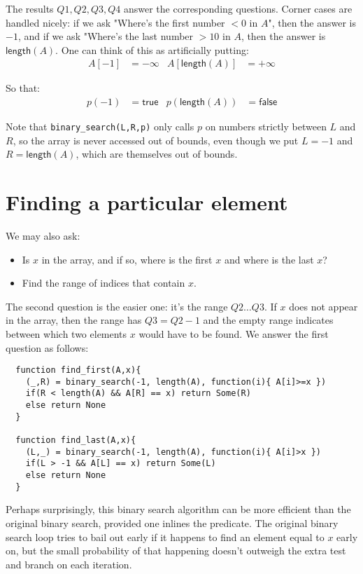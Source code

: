 \documentclass[a4paper, 11pt]{article}
\begin{document}
\noindent The results $Q1,Q2,Q3,Q4$ answer the corresponding questions. Corner cases are handled nicely: if we ask "Where's the first number $<0$ in $A$", then the answer is $-1$, and if we ask "Where's the last number $>10$ in $A$, then the answer is $\mathsf{length}(A)$. One can think of this as artificially putting:
\begin{align*}
  A[-1] &= -\infty & A[\mathsf{length}(A)] &= +\infty
\end{align*}

So that:
\begin{align*}
  p(-1) &= \mathsf{true} & p(\mathsf{length}(A)) &= \mathsf{false}
\end{align*}

Note that \lstinline|binary_search(L,R,p)| only calls $p$ on numbers strictly between $L$ and $R$, so the array is never accessed out of bounds, even though we put $L=-1$ and $R=\mathsf{length}(A)$, which are themselves out of bounds.

\section{Finding a particular element}

We may also ask:

\begin{itemize}
  \item Is $x$ in the array, and if so, where is the first $x$ and where is the last $x$?
  \item Find the range of indices that contain $x$.
\end{itemize}

\noindent The second question is the easier one: it's the range $Q2\dots Q3$. If $x$ does not appear in the array, then the range has $Q3 = Q2 - 1$ and the empty range indicates between which two elements $x$ would have to be found. We answer the first question as follows:

\begin{lstlisting}
  function find_first(A,x){
    (_,R) = binary_search(-1, length(A), function(i){ A[i]>=x })
    if(R < length(A) && A[R] == x) return Some(R)
    else return None
  }

  function find_last(A,x){
    (L,_) = binary_search(-1, length(A), function(i){ A[i]>x })
    if(L > -1 && A[L] == x) return Some(L)
    else return None
  }
\end{lstlisting}

Perhaps surprisingly, this binary search algorithm can be more efficient than the original binary search, provided one inlines the predicate. The original binary search loop tries to bail out early if it happens to find an element equal to $x$ early on, but the small probability of that happening doesn't outweigh the extra test and branch on each iteration.
\end{document}
